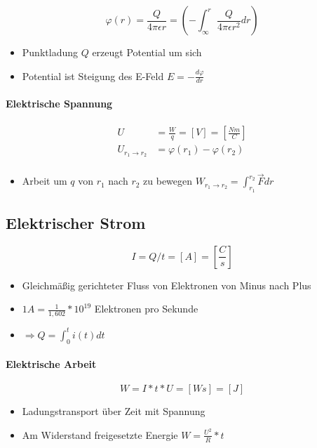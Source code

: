 $$\varphi(r) = \frac{Q}{4 \pi \epsilon r} = (-\int_\infty^r \frac{Q}{4 \pi \epsilon r^2} dr)$$

\begin{itemize}
  \item Punktladung $Q$ erzeugt Potential um sich
  \item Potential ist Steigung des E-Feld $E = - \frac{d\varphi}{dr}$
\end{itemize}

\paragraph{Elektrische Spannung}

\begin{align*}
  U                       & = \frac{W}{q} = [V] = [\frac{Nm}{C}] \\
  U_{r_1 \rightarrow r_2} & = \varphi(r_1) - \varphi(r_2)        \\
\end{align*}

\begin{itemize}
  \item Arbeit um $q$ von $r_1$ nach $r_2$ zu bewegen $W_{r_1 \rightarrow r_2} = \int_{r_1}^{r_2} \vec{F}dr$
\end{itemize}

\subsection{Elektrischer Strom}

$$I = Q/t = [A] = \left[\frac{C}{s}\right]$$

\begin{itemize}
  \item Gleichmä\ss ig gerichteter Fluss von Elektronen von Minus nach Plus
  \item $1A = \frac{1}{1,602} * 10^{19}$ Elektronen pro Sekunde
  \item $\Rightarrow Q = \int_0^t i(t)dt$
\end{itemize}

\paragraph{Elektrische Arbeit}

$$W = I * t * U = [Ws] = [J]$$

\begin{itemize}
  \item Ladungstransport über Zeit mit Spannung
  \item Am Widerstand freigesetzte Energie $W = \frac{U^2}{R} * t$
\end{itemize}


